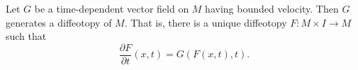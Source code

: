 Let $G$ be a time-dependent vector field on $M$ having bounded velocity. Then $G$ generates a diffeotopy of $M$. That is, there is a unique diffeotopy $F: M \times I \to M$ such that
$$\frac{\partial F}{\partial t}(x, t) = G(F(x, t), t).$$
